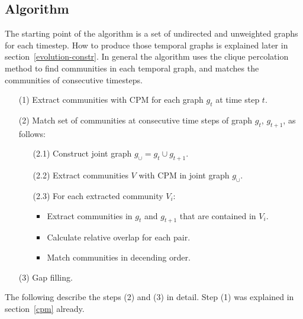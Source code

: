 \documentclass[runningheads,a4paper]{llncs}
\begin{document}
\subsection{Algorithm}
\label{evolution-algo}
The starting point of the algorithm is a set of undirected and unweighted  graphs for each timestep.
How to produce those temporal graphs is explained later in section~\ref{evolution-constr}.
In general the algorithm uses the clique percolation method to find communities in each temporal graph, and matches the communities of consecutive timesteps.

\begin{enumerate}
\small
\item[(1)] Extract communities with CPM for each graph $g_t$ at time step $t$.
\item[(2)] Match set of communities at consecutive time steps of graph $g_t$, $g_{t+1}$, as follows:
	\begin{enumerate}
		\item[(2.1)] Construct joint graph $g_{\cup}=g_t \cup g_{t+1}$.
		\item[(2.2)] Extract communities $V$ with CPM in joint graph $g_{\cup}$.
		\item[(2.3)] For each extracted community $V_i$: 
		\begin{itemize}
			\item Extract communities in $g_t$ and $g_{t+1}$ that are contained in $V_i$.
			\item Calculate relative overlap for each pair.
			\item Match communities in decending order.
		\end{itemize}
	\end{enumerate}
\item[(3)] Gap filling.
\end{enumerate}

The following describe the steps (2) and (3) in detail.
Step (1) was explained in section~\ref{cpm} already.
\end{document}
